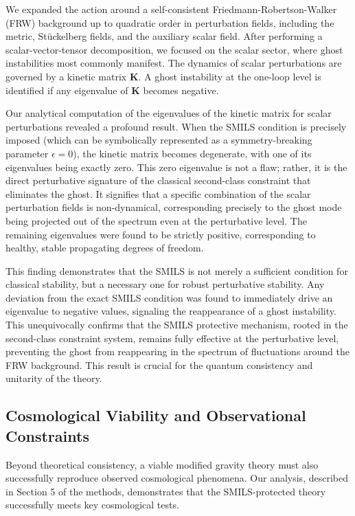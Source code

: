 \documentclass[twocolumn]{aastex631}
\begin{document}
We expanded the action around a self-consistent Friedmann-Robertson-Walker (FRW) background up to quadratic order in perturbation fields, including the metric, Stückelberg fields, and the auxiliary scalar field. After performing a scalar-vector-tensor decomposition, we focused on the scalar sector, where ghost instabilities most commonly manifest. The dynamics of scalar perturbations are governed by a kinetic matrix $\mathbf{K}$. A ghost instability at the one-loop level is identified if any eigenvalue of $\mathbf{K}$ becomes negative.

Our analytical computation of the eigenvalues of the kinetic matrix for scalar perturbations revealed a profound result. When the SMILS condition is precisely imposed (which can be symbolically represented as a symmetry-breaking parameter $\epsilon=0$), the kinetic matrix becomes degenerate, with one of its eigenvalues being exactly zero. This zero eigenvalue is not a flaw; rather, it is the direct perturbative signature of the classical second-class constraint that eliminates the ghost. It signifies that a specific combination of the scalar perturbation fields is non-dynamical, corresponding precisely to the ghost mode being projected out of the spectrum even at the perturbative level. The remaining eigenvalues were found to be strictly positive, corresponding to healthy, stable propagating degrees of freedom.

This finding demonstrates that the SMILS is not merely a sufficient condition for classical stability, but a necessary one for robust perturbative stability. Any deviation from the exact SMILS condition was found to immediately drive an eigenvalue to negative values, signaling the reappearance of a ghost instability. This unequivocally confirms that the SMILS protective mechanism, rooted in the second-class constraint system, remains fully effective at the perturbative level, preventing the ghost from reappearing in the spectrum of fluctuations around the FRW background. This result is crucial for the quantum consistency and unitarity of the theory.

\subsection{Cosmological Viability and Observational Constraints}
Beyond theoretical consistency, a viable modified gravity theory must also successfully reproduce observed cosmological phenomena. Our analysis, described in Section 5 of the methods, demonstrates that the SMILS-protected theory successfully meets key cosmological tests.
\end{document}
